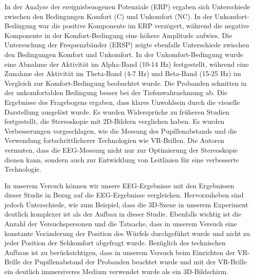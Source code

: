 \documentclass[conference]{IEEEtran}
\begin{document}
In der Analyse der ereignisbezogenen Potenziale (ERP) ergaben sich Unterschiede zwischen den Bedingungen Komfort (C) und Unkomfort (NC). In der Unkomfort-Bedingung war die positive Komponente im ERP verzögert, während die negative Komponente in der Komfort-Bedingung eine höhere Amplitude aufwies. Die Untersuchung der Frequenzbänder (ERSP) zeigte ebenfalls Unterschiede zwischen den Bedingungen Komfort und Unkomfort. In der Unkomfort-Bedingung wurde eine Abnahme der Aktivität im Alpha-Band (10-14 Hz) festgestellt, während eine Zunahme der Aktivität im Theta-Band (4-7 Hz) und Beta-Band (15-25 Hz) im Vergleich zur Komfort-Bedingung beobachtet wurde. Die Probanden schnitten in der unkomfortablen Bedingung besser bei der Tiefenwahrnehmung ab. Die Ergebnisse des Fragebogens ergaben, dass klares Unwohlsein durch die visuelle Darstellung ausgelöst wurde. Es wurden Widersprüche zu früheren Studien festgestellt, die Stereoskopie mit 2D-Bildern verglichen haben. Es wurden Verbesserungen vorgeschlagen, wie die Messung des Pupillenabstands und die Verwendung fortschrittlicherer Technologien wie VR-Brillen. Die Autoren vermuten, dass die EEG-Messung nicht nur zur Optimierung der Stereoskopie dienen kann, sondern auch zur Entwicklung von Leitlinien für eine verbesserte Technologie.

In unserem Versuch können wir unsere EEG-Ergebnisse mit den Ergebnissen dieser Studie in Bezug auf die EEG-Ergebnisse vergleichen. Hervorzuheben sind jedoch Unterschiede, wie zum Beispiel, dass die 3D-Szene in unserem Experiment deutlich komplexer ist als der Aufbau in dieser Studie. Ebenfalls wichtig ist die Anzahl der Versuchspersonen und die Tatsache, dass in unserem Versuch eine konstante Veränderung der Position des Würfels durchgeführt wurde und nicht zu jeder Position der Sehkomfort abgefragt wurde. Bezüglich des technischen Aufbaus ist zu berücksichtigen, dass in unserem Versuch beim Einrichten der VR-Brille der Pupillenabstand der Probanden beachtet wurde und mit der VR-Brille ein deutlich immersiveres Medium verwendet wurde als ein 3D-Bildschirm.
\end{document}
